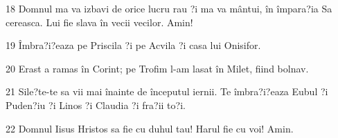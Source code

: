 \par 18 Domnul ma va izbavi de orice lucru rau ?i ma va mântui, în împara?ia Sa cereasca. Lui fie slava în vecii vecilor. Amin!
\par 19 Îmbra?i?eaza pe Priscila ?i pe Acvila ?i casa lui Onisifor.
\par 20 Erast a ramas în Corint; pe Trofim l-am lasat în Milet, fiind bolnav.
\par 21 Sile?te-te sa vii mai înainte de începutul iernii. Te îmbra?i?eaza Eubul ?i Puden?iu ?i Linos ?i Claudia ?i fra?ii to?i.
\par 22 Domnul Iisus Hristos sa fie cu duhul tau! Harul fie cu voi! Amin.


